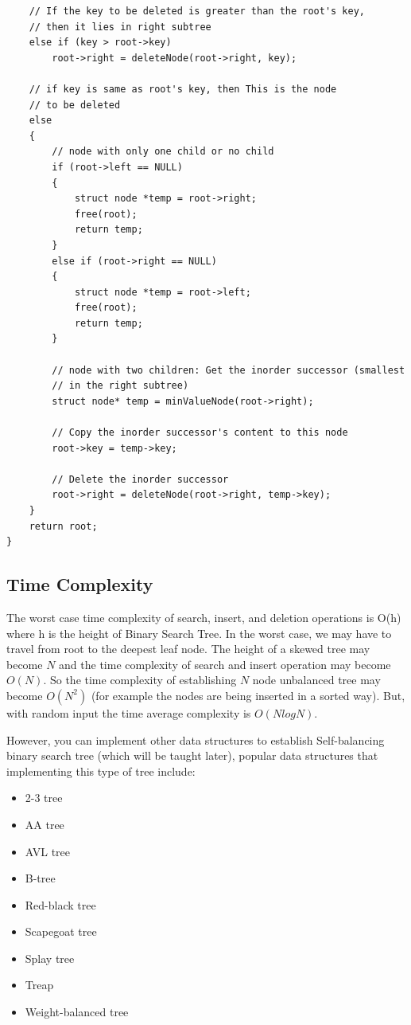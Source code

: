 \documentclass[12pt]{article}
\begin{document}
\begin{verbatim}
    // If the key to be deleted is greater than the root's key, 
    // then it lies in right subtree 
    else if (key > root->key) 
        root->right = deleteNode(root->right, key); 
  
    // if key is same as root's key, then This is the node 
    // to be deleted 
    else
    { 
        // node with only one child or no child 
        if (root->left == NULL) 
        { 
            struct node *temp = root->right; 
            free(root); 
            return temp; 
        } 
        else if (root->right == NULL) 
        { 
            struct node *temp = root->left; 
            free(root); 
            return temp; 
        } 
  
        // node with two children: Get the inorder successor (smallest 
        // in the right subtree) 
        struct node* temp = minValueNode(root->right); 
  
        // Copy the inorder successor's content to this node 
        root->key = temp->key; 
  
        // Delete the inorder successor 
        root->right = deleteNode(root->right, temp->key); 
    } 
    return root; 
} 

\end{verbatim}

\subsection{Time Complexity}
The worst case time complexity of search, insert, and deletion operations is O(h) where h is the height of Binary Search Tree. In the worst case, we may have to travel from root to the deepest leaf node. The height of a skewed tree may become $N$ and the time complexity of search and insert operation may become $O(N)$. So the time complexity of establishing $N$ node unbalanced tree may become $O(N^2)$ (for example the nodes are being inserted in a sorted way). But, with random input the time average complexity is $O(NlogN)$.

    However, you can implement other data structures to establish Self-balancing binary search tree (which will be taught later), popular data structures that implementing this type of tree include:
    \begin{itemize}
        \item 2-3 tree
        \item AA tree
        \item AVL tree
        \item B-tree
        \item Red-black tree
        \item Scapegoat tree
        \item Splay tree
        \item Treap
        \item Weight-balanced tree
    \end{itemize}
\end{document}
